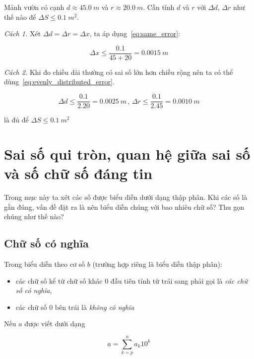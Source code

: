 \documentclass[../../Lectures.tex]{subfiles}
\begin{document}
\begin{exmp}
    Mảnh vườn có cạnh \(d \approx \SI{45.0}{m}\) và \(r \approx
    \SI{20.0}{m}\). Cần tính \(d\) và \(r\) với \(\Delta d\), \(\Delta r\) như
    thế nào để \(\Delta S \leq \SI{0.1}{m^2}\).

    \emph{Cách 1.}
    Xét \(\Delta d = \Delta r = \Delta x\), ta áp dụng~\ref{eq:same_error}:

    \[\Delta x \leq \frac{\num{0.1}}{45 + 20} = \SI{0.0015}{m}\]

    \emph{Cách 2.}
    Khi đo chiều dài thường có sai số lớn hơn chiều rộng nên ta có thể
    dùng~\ref{eq:evenly_distributed_error}.

    \[
        \Delta d \leq \frac{\num{0.1}}{\num{2.20}} = \SI{0.0025}{m} \, \text{, }
        \Delta r \leq \frac{\num{0.1}}{\num{2.45}} = \SI{0.0010}{m}
    \]

    là đủ để \(\Delta S \leq \SI{0.1}{m^2}\)
\end{exmp}

\section[Sai số quy tròn, quan hệ sai số \& số chữ số chắc]{Sai số qui tròn, quan hệ giữa sai số và số chữ số đáng tin}

Trong mục này ta xét các số được biểu diễn dưới dạng thập phân. Khi các số là
gần đúng, vấn đề đặt ra là nên biểu diễn chúng với bao nhiêu chữ số? Thu gọn
chúng như thế nào?

\subsection{Chữ số có nghĩa}

\begin{definition}
    Trong biểu diễn theo cơ số \(b\) (trường hợp riêng là biểu diễn thập phân):

    \begin{itemize}
        \item các chữ số kể từ chữ số khác \(0\) đầu tiên tính từ trái sang phải
            gọi là \emph{các chữ số có nghĩa},

        \item các chữ số \(0\) bên trái là \emph{không có nghĩa}
    \end{itemize}
\end{definition}

Nếu \(a\) được viết dưới dạng

\begin{equation} \label{eq:number_in_decimal}
    a = \sum_{k=p}^{n} a_k10^k
\end{equation}
\end{document}
